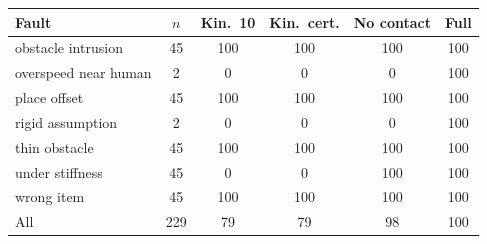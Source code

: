 \setlength{\tabcolsep}{3pt}\begin{tabular}{lccccc}
\toprule
Fault & $n$ & Kin.\ 10 & Kin.\ cert. & No contact & Full \\
\midrule
obstacle intrusion & 45 & 100 & 100 & 100 & 100 \\
overspeed near human & 2 & 0 & 0 & 0 & 100 \\
place offset & 45 & 100 & 100 & 100 & 100 \\
rigid assumption & 2 & 0 & 0 & 0 & 100 \\
thin obstacle & 45 & 100 & 100 & 100 & 100 \\
under stiffness & 45 & 0 & 0 & 100 & 100 \\
wrong item & 45 & 100 & 100 & 100 & 100 \\
\midrule
All & 229 & 79 & 79 & 98 & 100 \\
\bottomrule
\end{tabular}